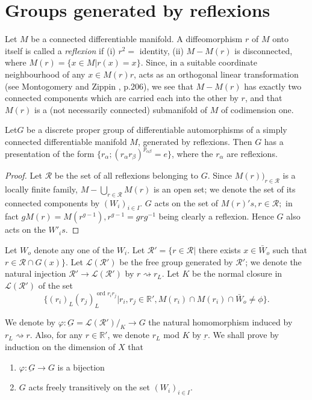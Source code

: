 {{\section{Groups generated by reflexions}\label{chap3:sec3}%

Let $M$ be a connected differentiable manifold. A diffeomorphism $r$
of $M$ onto itself is called a \textit{reflexion} if (i) $r^2 =$
identity, (ii) $M-M(r)$ is disconnected, where $M(r) =\{ x \in M| r(x)
=x \}$. Since, in a suitable coordinate neighbourhood of any $x \in M
(r)r$, acts as an orthogonal linear transformation (see Montogomery and
Zippin \cite{key1}, p.206), we see that $M-M(r)$ has exactly two connected
components which are carried each into the other by $r$, and that
$M(r)$ is a (not necessarily connected) submanifold of $M$ of
codimension one. 

\begin{thm}%
  Let\pageoriginale $G$ be a discrete proper group of differentiable
  automorphisms of 
  a simply connected differentiable manifold $M$, generated by
  reflexions. Then $G$ has a presentation of the form $\{ r_{\alpha};
  (r_\alpha r_\beta)^{p_{\alpha \beta}} =e\}$, where the $r_\alpha$ are
  reflexions. 
\end{thm}

\begin{proof}
  Let $\mathcal{R}$ be the set of all reflexions belonging to $G$. Since
  $M(r))_{r \in \mathcal{R} }$ is a locally finite family, $M - \bigcup
  \limits_{r \in \mathcal{R}}M(r)$ is an open set; we denote the set of
  its connected components by $(W_i)_{ i \in I}$. $G$ acts on the set of
  $M(r)'s, r \in \mathcal{R};$ in fact $gM(r) = M(r^{g-1}), r^{g-1}=
  grg^{-1}$ being clearly a reflexion. Hence $G$ also acts on the
  $W'_i s$. 
\end{proof}

Let $W_o$ denote any one of the $W_i$. Let $\mathcal{R}' = \{ r \in
\mathcal{R}|$ there exists $x \in \bar{W}_o$ such that $r \in
\mathcal{R} \cap G(x)\}$. Let $\mathscr{L} (\mathcal{R}')$ be the free
group generated by $\mathcal{R}'$; we denote the natural injection
$\mathcal{R}' \to \mathscr{L}(\mathcal{R}')$ by $r \rightsquigarrow
r_L$. Let $K$ be the normal closure in $\mathscr{L}(\mathcal{R}')$ of
the set  
$$
\Bigg\{ (r_i)_L (r_j)^{\text{ ord } r_i r_j}_L | r_i, r_j \in
\mathbb{R}' , M(r_i) \cap M(r_i) \cap \bar{W}_o \neq \phi \Bigg\}. 
$$

We denote by $\varphi : \underbar{G} =\mathscr{L}(\mathcal{R}')/_{K}
\to G$ the natural homomorphism induced by $r_L \rightsquigarrow r$. 
Also, for any $r \in \mathbb{R}'$, we denote $r_L $ mod $K$ by
$\underbar{r}$. We shall prove by induction on the dimension of $X$
that  
\begin{enumerate}[(1)]
\item $\varphi : \underbar{G} \to G$ is a bijection
\item $G$ acts freely transitively on the set $(W_i)_{i \in I}$.
\end{enumerate}

}}
